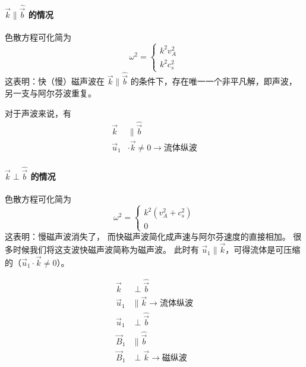 \paragraph{
    $\vec{k} \parallel \hat{\vec{b}}$
    的情况
}

色散方程可化简为
\begin{equation}
\omega^2 = \begin{cases}
    k^2 v_A^2 \\
    k^2 c_s^2
\end{cases}
\end{equation}
这表明：快（慢）磁声波在 $\vec{k} \parallel \hat{\vec{b}}$ 的条件下，存在唯一一个非平凡解，即声波，另一支与阿尔芬波重复。

对于声波来说，有
\begin{subequations}\begin{align}
\vec{k} &\parallel \hat{\vec{b}} \\
\vec{u}_1 &\cdot \vec{k} \neq 0 \rightarrow \text{流体纵波}
\end{align}\end{subequations}

\paragraph{
    $\vec{k} \perp \hat{\vec{b}}$
    的情况
}

色散方程可化简为
\begin{equation}
\omega^2 = \begin{cases}
    k^2 (v_A^2 + c_s^2) \\
    0
\end{cases}
\end{equation}
这表明：慢磁声波消失了，
而快磁声波简化成声速与阿尔芬速度的直接相加。
很多时候我们将这支波快磁声波简称为磁声波。
此时有 $\vec{u}_1 \parallel \vec{k}$，可得流体是可压缩的（$\vec{u}_1 \cdot \vec{k} \neq 0$）。

\begin{subequations}\begin{align}
\vec{k} &\perp \hat{\vec{b}} \\
\vec{u}_1 &\parallel \vec{k} \rightarrow \text{流体纵波} \\
\vec{u}_1 &\perp \hat{\vec{b}} \\
\vec{B}_1 &\parallel \hat{\vec{b}} \\
\vec{B}_1 &\perp \vec{k} \rightarrow \text{磁纵波}
\end{align}\end{subequations}

